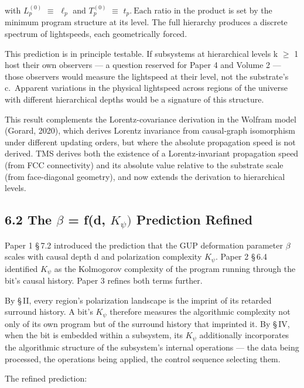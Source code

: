 \documentclass[11pt,oneside]{report}
\theoremstyle{definition}
\theoremstyle{remark}
\begin{document}
with \ensuremath{L_{p}^{(0)}} \ensuremath{\equiv} \ensuremath{\ell_{p}} and \ensuremath{T_{p}^{(0)}} \ensuremath{\equiv} \ensuremath{t_{p}.~\text{Each}} ratio in the product
is set by the minimum program structure at its level. The full hierarchy
produces a discrete spectrum of lightspeeds, each geometrically forced.

This prediction is in principle testable. If subsystems at hierarchical
levels k \ensuremath{\geq} 1 host their own observers --- a question reserved for Paper
4 and Volume 2 --- those observers would measure the lightspeed at their
level, not the substrate's c.~Apparent variations in the physical
lightspeed across regions of the universe with different hierarchical
depths would be a signature of this structure.

This result complements the Lorentz-covariance derivation in the Wolfram
model (Gorard, 2020), which derives Lorentz invariance from causal-graph
isomorphism under different updating orders, but where the absolute
propagation speed is not derived. TMS derives both the existence of a
Lorentz-invariant propagation speed (from FCC connectivity) and its
absolute value relative to the substrate scale (from face-diagonal
geometry), and now extends the derivation to hierarchical levels.

\subsection*{6.2 The \ensuremath{\beta} = f(d, \ensuremath{K_{\psi})} Prediction Refined}

Paper 1 \S\,7.2 introduced the prediction that the GUP deformation
parameter \ensuremath{\beta} scales with causal depth d and polarization complexity \ensuremath{K_{\psi}.}
Paper 2 \S\,6.4 identified \ensuremath{K_{\psi}} as the Kolmogorov complexity of the program
running through the bit's causal history. Paper 3 refines both terms
further.

By \S\,II, every region's polarization landscape is the imprint of its
retarded surround history. A bit's \ensuremath{K_{\psi}} therefore measures the
algorithmic complexity not only of its own program but of the surround
history that imprinted it. By \S\,IV, when the bit is embedded within a
subsystem, its \ensuremath{K_{\psi}} additionally incorporates the algorithmic structure
of the subsystem's internal operations --- the data being processed, the
operations being applied, the control sequence selecting them.

The refined prediction:
\end{document}
